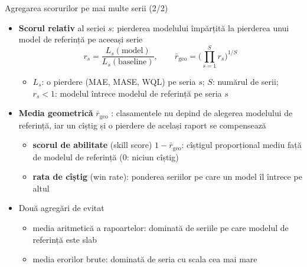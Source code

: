 \begin{frame}{Agregarea scorurilor pe mai multe serii (2/2)}
\itemsize{\small}
\begin{itemize}
    \item \textbf{Scorul relativ} al seriei $s$: pierderea modelului împărțită la pierderea unui model de referință pe aceeași serie \[ r_s = \frac{L_s(\text{model})}{L_s(\text{baseline})}, \qquad \bar r_{\mathrm{geo}} = \Big(\prod_{s=1}^{S} r_s\Big)^{1/S} \]
    \begin{itemize}
        \item $L_s$: o pierdere (MAE, MASE, WQL) pe seria $s$; $S$: numărul de serii; $r_s < 1$: modelul întrece modelul de referință pe seria $s$
    \end{itemize}
    \item \textbf{Media geometrică} $\bar r_{\mathrm{geo}}$ : clasamentele nu depind de alegerea modelului de referință, iar un cîștig și o pierdere de același raport se compensează
    \begin{itemize}
        \item \textbf{scorul de abilitate} (skill score) $1 - \bar r_{\mathrm{geo}}$: cîștigul proporțional mediu față de modelul de referință (0: niciun cîștig)
        \item \textbf{rata de cîștig} (win rate): ponderea seriilor pe care un model îl întrece pe altul
    \end{itemize}
    \item Două agregări de evitat
    \begin{itemize}
        \item media aritmetică a rapoartelor: dominată de seriile pe care modelul de referință este slab
        \item media erorilor brute: dominată de seria cu scala cea mai mare
    \end{itemize}
\end{itemize}
\end{frame}

